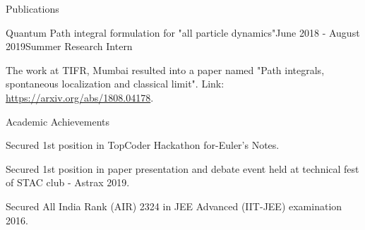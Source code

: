 \documentclass{resume} %
\begin{document}
\begin{rSection}{Publications}

\begin{rSubsection}{Quantum Path integral formulation for "all particle dynamics"}{June 2018 - August 2019}{Summer Research Intern}{}
\item The work at TIFR, Mumbai resulted into a paper named "Path integrals, spontaneous localization and classical limit". Link: \url{https://arxiv.org/abs/1808.04178}.
\end{rSubsection}

\end{rSection}

\begin{rSection}{Academic Achievements}
\item Secured 1st position in TopCoder Hackathon for-Euler’s Notes.
\item Secured 1st position in paper presentation and debate event held at technical fest of STAC club - Astrax 2019.
\item Secured All India Rank (AIR) 2324 in JEE Advanced (IIT-JEE) examination 2016.  
\end{rSection}

\end{document}
